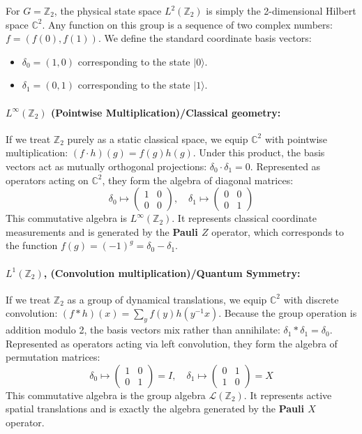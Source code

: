\documentclass[11pt]{article}
\begin{document}
For $G = \mathbb{Z}_2$, the physical state space $L^2(\mathbb{Z}_2)$ is simply the 2-dimensional Hilbert space $\mathbb{C}^2$. Any function on this group is a sequence of two complex numbers: $f = (f(0), f(1))$. We define the standard coordinate basis vectors:
\begin{itemize}
    \item $\delta_0 = (1, 0)$ corresponding to the state $|0\rangle$.
    \item $\delta_1 = (0, 1)$ corresponding to the state $|1\rangle$.
\end{itemize}

\paragraph{$L^\infty(\mathbb{Z}_2)$ (Pointwise Multiplication)/Classical geometry:} If we treat $\mathbb{Z}_2$ purely as a static classical space, we equip $\mathbb{C}^2$ with pointwise multiplication: $(f \cdot h)(g) = f(g)h(g)$.
Under this product, the basis vectors act as mutually orthogonal projections: $\delta_0 \cdot \delta_1 = 0$. Represented as operators acting on $\mathbb{C}^2$, they form the algebra of diagonal matrices:
\begin{equation}
    \delta_0 \mapsto \begin{pmatrix} 1 & 0 \\ 0 & 0 \end{pmatrix}, \quad \delta_1 \mapsto \begin{pmatrix} 0 & 0 \\ 0 & 1 \end{pmatrix}
\end{equation}
This commutative algebra is $L^\infty(\mathbb{Z}_2)$. It represents classical coordinate measurements and is generated by the \textbf{Pauli $Z$} operator, which corresponds to the function $f(g) = (-1)^g = \delta_0 - \delta_1$.

\paragraph{$L^1(\mathbb{Z}_2)$, (Convolution multiplication)/Quantum Symmetry:} If we treat $\mathbb{Z}_2$ as a group of dynamical translations, we equip $\mathbb{C}^2$ with discrete convolution: $(f * h)(x) = \sum_y f(y)h(y^{-1}x)$. 
Because the group operation is addition modulo 2, the basis vectors mix rather than annihilate: $\delta_1 * \delta_1 = \delta_0$. Represented as operators acting via left convolution, they form the algebra of permutation matrices:
\begin{equation}
    \delta_0 \mapsto \begin{pmatrix} 1 & 0 \\ 0 & 1 \end{pmatrix} = I, \quad \delta_1 \mapsto \begin{pmatrix} 0 & 1 \\ 1 & 0 \end{pmatrix} = X
\end{equation}
This commutative algebra is the group algebra $\mathcal{L}(\mathbb{Z}_2)$. It represents active spatial translations and is exactly the algebra generated by the \textbf{Pauli $X$} operator.
\end{document}

